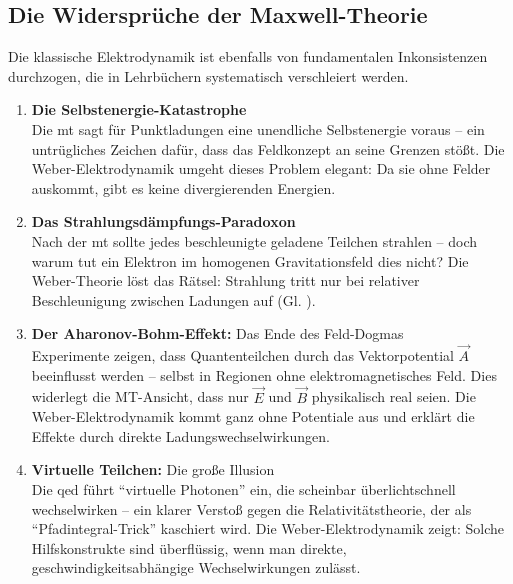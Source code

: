 \subsection{Die Widersprüche der Maxwell-Theorie}
Die klassische Elektrodynamik ist ebenfalls von fundamentalen Inkonsistenzen durchzogen, die in Lehrbüchern systematisch verschleiert werden.
\begin{enumerate}
    \item \textbf{Die Selbstenergie-Katastrophe}\\Die \gls{mt} sagt für Punktladungen eine unendliche Selbstenergie voraus – ein untrügliches Zeichen dafür, dass das Feldkonzept an seine Grenzen stößt. Die Weber-Elektrodynamik umgeht dieses Problem elegant: Da sie ohne Felder auskommt, gibt es keine divergierenden Energien.
    \item \textbf{Das Strahlungsdämpfungs-Paradoxon}\\Nach der \gls{mt} sollte jedes beschleunigte geladene Teilchen strahlen – doch warum tut ein Elektron im homogenen Gravitationsfeld dies nicht? Die Weber-Theorie löst das Rätsel: Strahlung tritt nur bei relativer Beschleunigung zwischen Ladungen auf (Gl. ).
    \item \textbf{Der Aharonov-Bohm-Effekt:} Das Ende des Feld-Dogmas\\Experimente zeigen, dass Quantenteilchen durch das Vektorpotential $\vec{A}$ beeinflusst werden – selbst in Regionen ohne elektromagnetisches Feld. Dies widerlegt die MT-Ansicht, dass nur $\vec{E}$ und $\vec{B}$ physikalisch real seien. Die Weber-Elektrodynamik kommt ganz ohne Potentiale aus und erklärt die Effekte durch direkte Ladungswechselwirkungen.
    \item \textbf{Virtuelle Teilchen:} Die große Illusion\\Die \gls{qed} führt \enquote{virtuelle Photonen} ein, die scheinbar überlichtschnell wechselwirken – ein klarer Verstoß gegen die Relativitätstheorie, der als \enquote{Pfadintegral-Trick} kaschiert wird. Die Weber-Elektrodynamik zeigt: Solche Hilfskonstrukte sind überflüssig, wenn man direkte, geschwindigkeitsabhängige Wechselwirkungen zulässt.
\end{enumerate}
